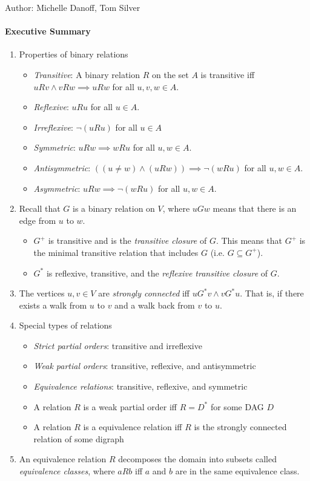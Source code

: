 \documentclass[solution, letterpaper]{cs20inclass}
\begin{document}

\noindent Author: Michelle Danoff, Tom Silver%

\paragraph*{Executive Summary}
\begin{enumerate}
\item Properties of binary relations
\begin{itemize}
\item \textit{Transitive}: A binary relation $R$ on the set $A$ is transitive iff\\$u R v \wedge v R w \implies u R w$ for all $u,v,w \in A$.
\item \textit{Reflexive}: $u R u$ for all $u \in A$.
\item \textit{Irreflexive}: $\neg(uRu)$ for all $u \in A$
\item \textit{Symmetric}: $u R w \implies w R u$ for all $u,w \in A$.
\item \textit{Antisymmetric}: $((u \neq w) \land (u R w)) \implies \neg(wRu)$ for all $u, w \in A$.
\item \textit{Asymmetric}: $u R w \implies \neg(wRu)$ for all $u, w \in A$.
\end{itemize}
\item Recall that $G$ is a binary relation on $V$, where $uGw$ means that there is an edge from $u$ to $w$.
\begin{itemize}
\item $G^+$ is transitive and is the \textit{transitive closure} of $G$. This means that $G^+$ is the minimal transitive relation that includes $G$ (i.e. $G \subseteq G^+$).
\item $G^*$ is reflexive, transitive, and the \textit{reflexive transitive closure} of $G$.
\end{itemize}
\item The vertices $u,v \in V$ are \textit{strongly connected} iff $uG^*v \wedge vG^*u$. That is, if there exists a walk from $u$ to $v$ and a walk back from $v$ to $u$.
\item Special types of relations
\begin{itemize}
\item \textit{Strict partial orders}: transitive and irreflexive
\item \textit{Weak partial orders}: transitive, reflexive, and antisymmetric
\item \textit{Equivalence relations}: transitive, reflexive, and symmetric
\item A relation $R$ is a weak partial order iff $R = D^*$ for some DAG $D$
\item A relation $R$ is a equivalence relation iff $R$ is the strongly connected relation of some digraph
\end{itemize}
\item An equivalence relation $R$ decomposes the domain into subsets called \textit{equivalence classes}, where $aRb$ iff $a$ and $b$ are in the same equivalence class.
\end{enumerate}
\end{document}
